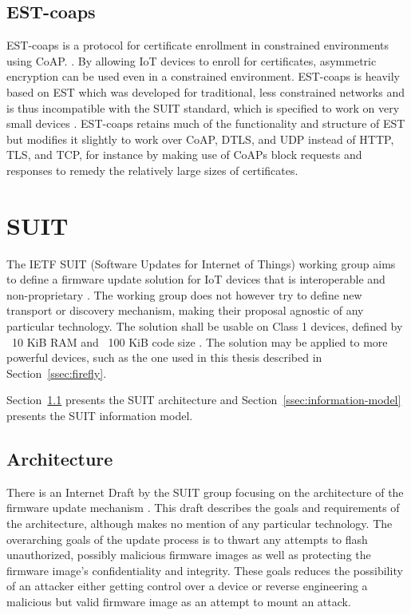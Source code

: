 \documentclass[0-thesis.tex]{subfiles}
\begin{document}
\subsection{EST-coaps}
\label{ssec:est-coaps}
EST-coaps is a protocol for certificate enrollment in constrained environments using CoAP.
\parencite{est-coaps}. By allowing IoT devices to enroll for certificates, asymmetric
encryption can be used even in a constrained environment. EST-coaps is heavily based on
EST which was developed for traditional, less constrained networks and is thus
incompatible with the SUIT standard, which is specified to work on very small devices
\parencite{rfc7030}. EST-coaps retains much of the functionality and structure of EST but
modifies it slightly to work over CoAP, DTLS, and UDP instead of HTTP, TLS, and TCP, for
instance by making use of CoAPs block requests and responses to remedy the relatively
large sizes of certificates.

\section{SUIT}
\label{sec:suit}
The IETF SUIT (Software Updates for Internet of Things) working group aims to define a
firmware update solution for IoT devices that is interoperable and non-proprietary
\parencite{suit}. The working group does not however try to define new transport or
discovery mechanism, making their proposal agnostic of any particular technology. The
solution shall be usable on Class 1 devices, defined by ~10 KiB RAM and ~100 KiB code size
\parencite{rfc7228}. The solution may be applied to more powerful devices, such as the one
used in this thesis described in Section~\ref{ssec:firefly}.

Section~\ref{ssec:architecture} presents the SUIT architecture and
Section~\ref{ssec:information-model} presents the SUIT information model.

\subsection{Architecture}
\label{ssec:architecture}
There is an Internet Draft by the SUIT group focusing on the architecture of the firmware
update mechanism \parencite{suit-architecture}. This draft describes the goals and
requirements of the architecture, although makes no mention of any particular technology.
The overarching goals of the update process is to thwart any attempts to flash
unauthorized, possibly malicious firmware images as well as protecting the firmware
image's confidentiality and integrity. These goals reduces the possibility of an attacker
either getting control over a device or reverse engineering a malicious but valid firmware
image as an attempt to mount an attack.
\end{document}
